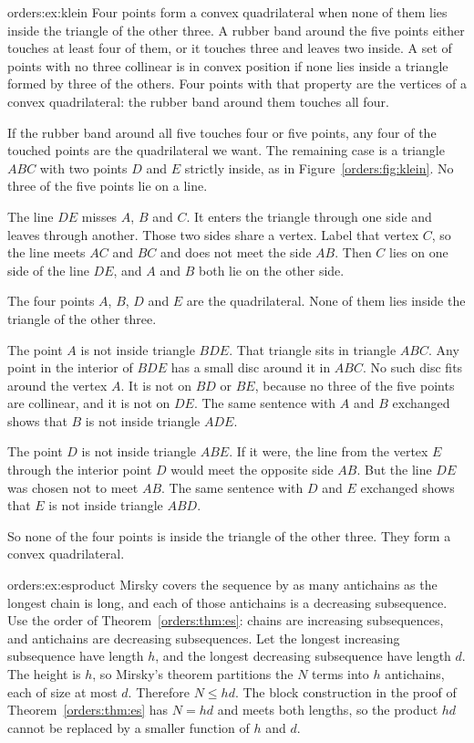 \begin{solution}{orders:ex:klein}
\idea Four points form a convex quadrilateral when none of them lies inside the triangle of the other three. A rubber band around the five points either touches at least four of them, or it touches three and leaves two inside.
\writeup A set of points with no three collinear is in convex position if none lies inside a triangle formed by three of the others. Four points with that property are the vertices of a convex quadrilateral: the rubber band around them touches all four.

If the rubber band around all five touches four or five points, any four of the touched points are the quadrilateral we want. The remaining case is a triangle $ABC$ with two points $D$ and $E$ strictly inside, as in Figure~\ref{orders:fig:klein}. No three of the five points lie on a line.

The line $DE$ misses $A$, $B$ and $C$. It enters the triangle through one side and leaves through another. Those two sides share a vertex. Label that vertex $C$, so the line meets $AC$ and $BC$ and does not meet the side $AB$. Then $C$ lies on one side of the line $DE$, and $A$ and $B$ both lie on the other side.

The four points $A$, $B$, $D$ and $E$ are the quadrilateral. None of them lies inside the triangle of the other three.

The point $A$ is not inside triangle $BDE$. That triangle sits in triangle $ABC$. Any point in the interior of $BDE$ has a small disc around it in $ABC$. No such disc fits around the vertex $A$. It is not on $BD$ or $BE$, because no three of the five points are collinear, and it is not on $DE$. The same sentence with $A$ and $B$ exchanged shows that $B$ is not inside triangle $ADE$.

The point $D$ is not inside triangle $ABE$. If it were, the line from the vertex $E$ through the interior point $D$ would meet the opposite side $AB$. But the line $DE$ was chosen not to meet $AB$. The same sentence with $D$ and $E$ exchanged shows that $E$ is not inside triangle $ABD$.

So none of the four points is inside the triangle of the other three. They form a convex quadrilateral.
\end{solution}

\begin{solution}{orders:ex:esproduct}
\idea Mirsky covers the sequence by as many antichains as the longest chain is long, and each of those antichains is a decreasing subsequence.
\writeup Use the order of Theorem~\ref{orders:thm:es}: chains are increasing subsequences, and antichains are decreasing subsequences. Let the longest increasing subsequence have length $h$, and the longest decreasing subsequence have length $d$. The height is $h$, so Mirsky's theorem partitions the $N$ terms into $h$ antichains, each of size at most $d$. Therefore $N\le hd$. The block construction in the proof of Theorem~\ref{orders:thm:es} has $N=hd$ and meets both lengths, so the product $hd$ cannot be replaced by a smaller function of $h$ and $d$.
\end{solution}

